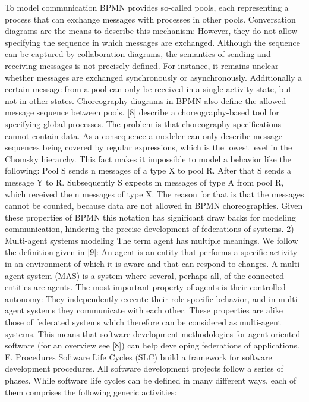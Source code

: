 To model communication BPMN provides so-called pools, each representing a process that can exchange messages with processes in other pools. Conversation diagrams are the means to describe this mechanism: However, they do not allow specifying the sequence in which messages are exchanged. Although the sequence can be captured by collaboration diagrams, the semantics of sending and receiving messages is not precisely defined. For instance, it remains unclear whether messages are exchanged synchronously or asynchronously. Additionally a certain message from a pool can only be received in a single activity state, but not in other states. Choreography diagrams in BPMN also define the allowed message sequence between pools. [8] describe a choreography-based tool for specifying global processes. The problem is that choreography specifications cannot contain data. As a consequence a modeler can only describe message sequences being covered by regular expressions, which is the lowest level in the Chomsky hierarchy. This fact makes it impossible to model a behavior like the following: Pool S sends n messages of a type X to pool R. After that S sends a message Y to R. Subsequently S expects m messages of type A from pool R, which received the n messages of type X. The reason for that is that the messages cannot be counted, because data are not allowed in BPMN choreographies.
Given these properties of BPMN this notation has significant draw backs for modeling communication, hindering the precise development of federations of systems.
2)	Multi-agent systems modeling
The term agent has multiple meanings. We follow the definition given in [9]: An agent is an entity that performs a specific activity in an environment of which it is aware and that can respond to changes. A multi-agent system (MAS) is a system where several, perhaps all, of the connected entities are agents. The most important property of agents is their controlled autonomy: They independently execute their role-specific behavior, and in multi-agent systems they communicate with each other. These properties are alike those of federated systems which therefore can be considered as multi-agent systems. This means that software development methodologies for agent-oriented software (for an overview see [8]) can help developing federations of applications.
\\
E.	Procedures
Software Life Cycles (SLC) build a framework for software development procedures. All software development projects follow a series of phases. While software life cycles can be defined in many different ways, each of them comprises the following generic activities:
